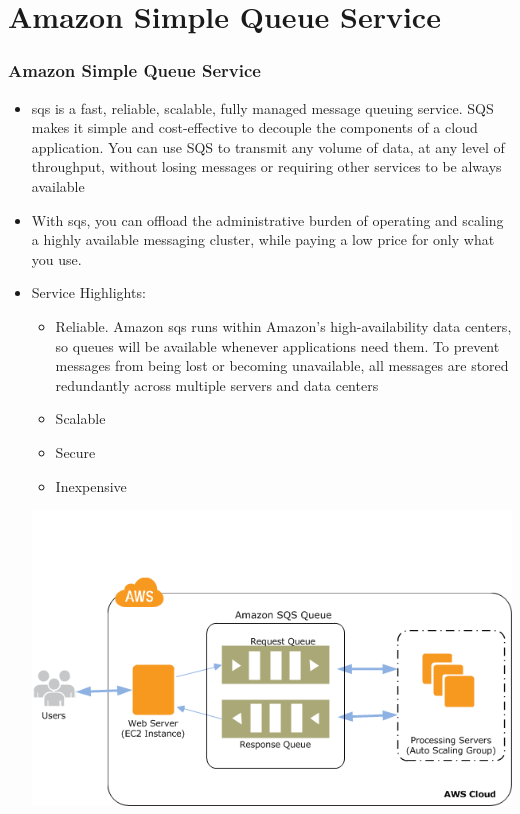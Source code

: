 \documentclass{beamer}
\begin{document}
\section{Amazon Simple Queue Service}
\begin{frame}
\frametitle{Amazon Simple Queue Service}
\begin{itemize}
\item \acrfull{sqs} is a fast, reliable, scalable, fully managed message queuing service. SQS makes it simple and cost-effective to decouple the components of a cloud application. You can use SQS to transmit any volume of data, at any level of throughput, without losing messages or requiring other services to be always available

\item With \acrshort{sqs}, you can offload the administrative burden of operating and scaling a highly available messaging cluster, while paying a low price for only what you use.

\item Service Highlights:
\begin{itemize}
\item Reliable. Amazon \acrshort{sqs} runs within Amazon’s high-availability data centers, so queues will be available whenever applications need them. To prevent messages from being lost or becoming unavailable, all messages are stored redundantly across multiple servers and data centers
\item Scalable
\item Secure
\item Inexpensive
\end{itemize}

\includegraphics[width=0.75 \textwidth]{sqs-as-workflow.png}
\end{itemize}
\end{frame}
\end{document}
